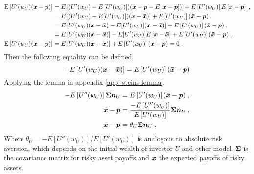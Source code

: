 \begin{equation*}
	\begin{split}
		\mathrm{E}\left[U'(w_{U})(\bm{x}-\bm{p})\right] &= E\left[(U'(w_U)-E\left[U'(w_U)\right])(\bm{x}-\bm{p}-E\left[\bm{x}-\bm{p}\right])\right] + E\left[U'(w_U)\right]E\left[\bm{x}-\bm{p}\right]\;,\\
		&= E\left[(U'(w_U)-E[U'(w_U)])(\bm{x}-\bm{\Bar{x}})\right]+ E\left[U'(w_U)\right](\bm{\Bar{x}}-\bm{p})\;,\\
		&= E\left[U'(w_U)(\bm{x}-\Bar{\bm{x}})-E[U'(w_U)](\bm{x}-\bm{\Bar{x}})\right]+ E\left[U'(w_U)\right](\bm{\Bar{x}}-\bm{p})\;,\\
		&= E\left[U'(w_U)(\bm{x}-\Bar{\bm{x}})\right]-E[U'(w_U)]E\left[\bm{x}-\bm{\Bar{x}}\right]+ E\left[U'(w_U)\right](\bm{\Bar{x}}-\bm{p})\;,\\
		\mathrm{E}\left[U'(w_{U})(\bm{x}-\bm{p})\right] &= E\left[U'(w_U)(\bm{x}-\bm{\Bar{x}})\right]+ E\left[U'(w_U)\right](\bm{\Bar{x}}-\bm{p})=0\;.
	\end{split}
\end{equation*}
Then the following equality can be defined,
\begin{equation*}
	-E\left[U'(w_U)(\bm{x}-\bm{\Bar{x}})\right]= E\left[U'(w_U)\right](\bm{\Bar{x}}-\bm{p})
\end{equation*}
Applying the lemma in appendix \ref{app: steins lemma},
\begin{equation}
	\begin{split}
		-E\left[U''(w_U)\right]\bm{\Sigma}\bm{n}_{U}&=E\left[U'(w_U)\right](\bm{\Bar{x}}-\bm{p})\;,\\
		\bm{\Bar{\bm{x}}}-\bm{p} &= \frac{-E\left[U''(w_U)\right]}{E\left[U'(w_U)\right]}\bm{\Sigma}\bm{n}_U\;,\\
		\bm{\Bar{\bm{x}}}-\bm{p} &= \theta_U\bm{\Sigma}\bm{n}_U\;.
	\end{split}
	\label{eq:unrestricted}
\end{equation}
Where $\theta_{U}={-E\left[U''(w_U)\right]}/{E\left[U'(w_U)\right]}$ is analogous to absolute risk aversion, which depends on the initial wealth of investor $U$ and other model. $\bm{\Sigma}$ is the covariance matrix for risky asset payoffs and $\Bar{\bm{x}}$ the expected payoffs of risky assets.

